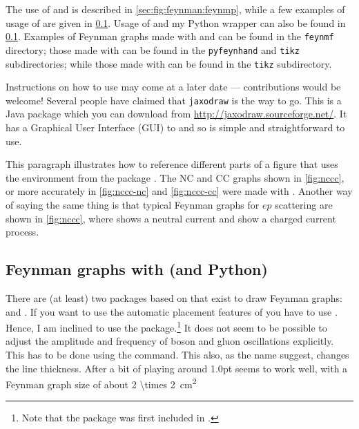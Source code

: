 The use of  and  is
described in \cref{sec:fig:feynman:feynmp}, while a few
examples of usage of \Package{\TikZ} are given in
\cref{sec:fig:feynman:tikz}.
Usage of  and my Python wrapper 
can also be found in \cref{sec:fig:feynman:tikz}.
Examples of Feynman graphs made
with  and  can be found in the \texttt{feynmf} directory;
those made with  can be found in the \texttt{pyfeynhand} and \texttt{tikz} subdirectories;
while those made with \Package{\TikZ} can be found in the \texttt{tikz} subdirectory.

Instructions on how to use  may come at a later
date --- contributions would be welcome! Several people have claimed
that \texttt{jaxodraw} is the way to go. This is a Java package which
you can download from \url{http://jaxodraw.sourceforge.net/}. It has
a Graphical User Interface (GUI) to  and so is simple and
straightforward to use.

This paragraph illustrates how to reference different parts of a
figure that uses the environment  from the package .
The NC and CC graphs shown in
\cref{fig:nccc}, or more accurately in \cref{fig:nccc-nc} and
\cref{fig:nccc-cc} were made with . Another way of
saying the same thing is that typical Feynman graphs for \(ep\)
scattering are shown in \cref{fig:nccc}, where
 shows a neutral current and 
show a charged current process.


\subsection{Feynman graphs with \TikZ (and Python)}%
\label{sec:fig:feynman:tikz}

There are (at least) two packages based on \TikZ that exist to draw Feynman graphs:
 and .
If you want to use the automatic placement features of 
you have to use \LuaLaTeX.
Hence, I am inclined to use the  package.\footnote{%
Note that the  package was first included in .}
It does not seem to be possible to adjust the amplitude and frequency
of boson and gluon oscillations explicitly.
This has to be done using the  command.
This also, as the name suggest, changes the line thickness.
After a bit of playing around \num{1.0}{pt} seems to work well,
with a Feynman graph size of about \SI[parse-numbers=false]{2 \times 2}{\cm^{2}}

